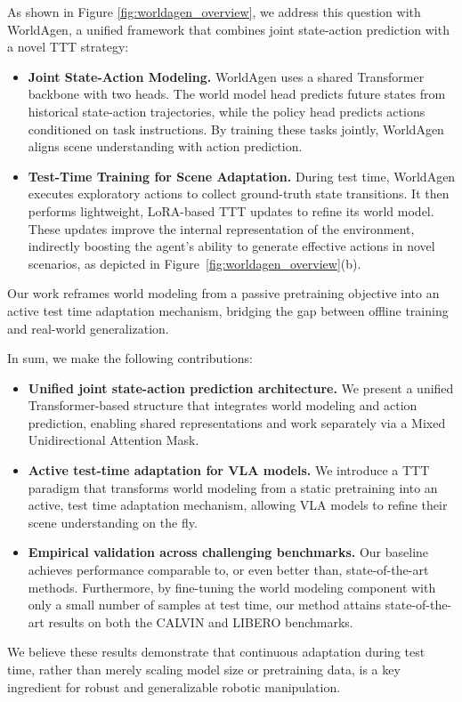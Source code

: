As shown in Figure \ref{fig:worldagen_overview}, we address this question with WorldAgen, a unified framework that combines joint state-action prediction with a novel TTT strategy:

\begin{itemize}
    \item \textbf{Joint State-Action Modeling.} WorldAgen uses a shared Transformer backbone with two heads. The world model head predicts future states from historical state-action trajectories, while the policy head predicts actions conditioned on task instructions. By training these tasks jointly, WorldAgen aligns scene understanding with action prediction.
    \item \textbf{Test-Time Training for Scene Adaptation.} During test time, WorldAgen executes exploratory actions to collect ground-truth state transitions. It then performs lightweight, LoRA-based TTT updates to refine its world model. These updates improve the internal representation of the environment, indirectly boosting the agent's ability to generate effective actions in novel scenarios, as depicted in Figure~\ref{fig:worldagen_overview}(b).
\end{itemize}
Our work reframes world modeling from a passive pretraining objective into an active test time adaptation mechanism, bridging the gap between offline training and real-world generalization.


In sum, we make the following contributions:
\begin{itemize}
    \item \textbf{Unified joint state-action prediction architecture.} We present a unified Transformer-based structure that integrates world modeling and action prediction, enabling shared representations and work separately via a Mixed Unidirectional Attention Mask.
    \item \textbf{Active test-time adaptation for VLA models.} We introduce a TTT paradigm that transforms world modeling from a static pretraining into an active, test time adaptation mechanism, allowing VLA models to refine their scene understanding on the fly.
   \item \textbf{Empirical validation across challenging benchmarks.} Our baseline achieves performance comparable to, or even better than, state-of-the-art methods. Furthermore, by fine-tuning the world modeling component with only a small number of samples at test time, our method attains state-of-the-art results on both the CALVIN and LIBERO benchmarks.

\end{itemize}
We believe these results demonstrate that continuous adaptation during test time, rather than merely scaling model size or pretraining data, is a key ingredient for robust and generalizable robotic manipulation.